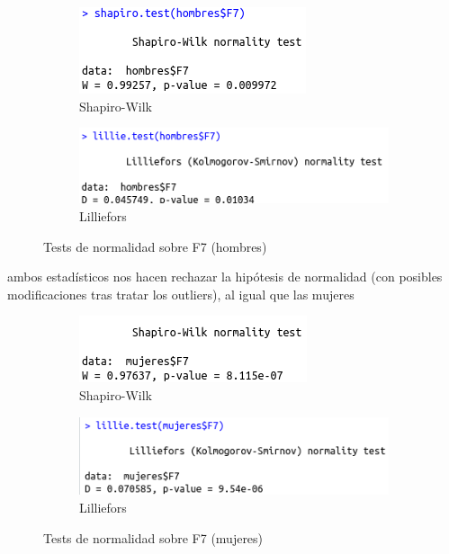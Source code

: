 \begin{figure}[H]
	\centering
	\begin{subfigure}{.5\textwidth}
		\centering
		\includegraphics[width=.6\linewidth]{swh-F7.png}
		\caption{Shapiro-Wilk}
		\label{fig:swh-F7}
	\end{subfigure}%
	\begin{subfigure}{.5\textwidth}
		\centering
		\includegraphics[width=.6\linewidth]{lh-F7.png}
		\caption{Lilliefors}
		\label{fig:lh-F7}
	\end{subfigure}
	\caption{Tests de normalidad sobre F7 (hombres)}
	\label{fig:normhF7}
\end{figure}

ambos estadísticos nos hacen rechazar la hipótesis de normalidad (con posibles modificaciones tras tratar los outliers), al igual que las mujeres

\begin{figure}[H]
	\centering
	\begin{subfigure}{.5\textwidth}
		\centering
		\includegraphics[width=.6\linewidth]{swm-F7.png}
		\caption{Shapiro-Wilk}
		\label{fig:swm-F7}
	\end{subfigure}%
	\begin{subfigure}{.5\textwidth}
		\centering
		\includegraphics[width=.6\linewidth]{lm-F7.png}
		\caption{Lilliefors}
		\label{fig:lm-F7}
	\end{subfigure}
	\caption{Tests de normalidad sobre F7 (mujeres)}
	\label{fig:normmF7}
\end{figure}


